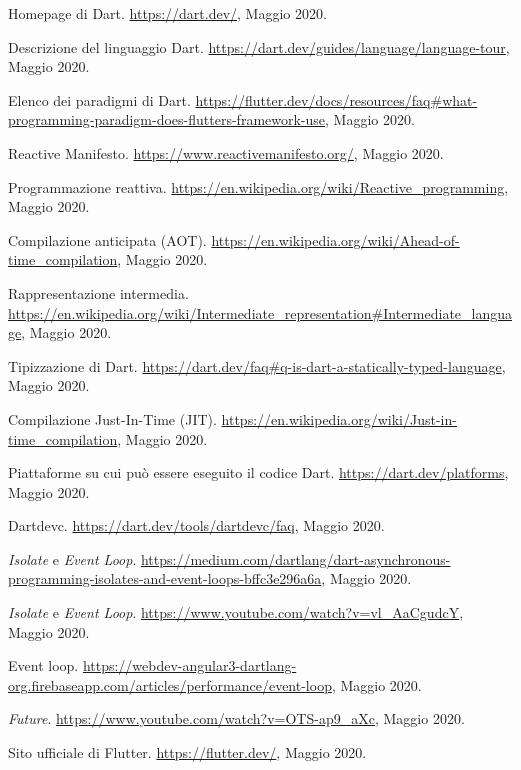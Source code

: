 \begin{thebibliography}{3}
Homepage di Dart. \url{https://dart.dev/}, Maggio 2020.

Descrizione del linguaggio Dart. \url{https://dart.dev/guides/language/language-tour}, Maggio 2020.

Elenco dei paradigmi di Dart. \url{https://flutter.dev/docs/resources/faq#what-programming-paradigm-does-flutters-framework-use}, Maggio 2020.

Reactive Manifesto. \url{https://www.reactivemanifesto.org/}, Maggio 2020.

Programmazione reattiva. \url{https://en.wikipedia.org/wiki/Reactive_programming}, Maggio 2020.

Compilazione anticipata (AOT). \url{https://en.wikipedia.org/wiki/Ahead-of-time_compilation}, Maggio 2020.

Rappresentazione intermedia. \url{https://en.wikipedia.org/wiki/Intermediate_representation#Intermediate_language}, Maggio 2020.

Tipizzazione di Dart. \url{https://dart.dev/faq#q-is-dart-a-statically-typed-language}, Maggio 2020.

Compilazione Just-In-Time (JIT). 
\url{https://en.wikipedia.org/wiki/Just-in-time_compilation}, Maggio 2020.

Piattaforme su cui può essere eseguito il codice Dart. \url{https://dart.dev/platforms}, Maggio 2020.

Dartdevc. \url{https://dart.dev/tools/dartdevc/faq}, Maggio 2020.

\textit{Isolate} e \textit{Event Loop}. \url{https://medium.com/dartlang/dart-asynchronous-programming-isolates-and-event-loops-bffc3e296a6a}, Maggio 2020.

\textit{Isolate} e \textit{Event Loop}. \url{https://www.youtube.com/watch?v=vl_AaCgudcY}, Maggio 2020.

Event loop. \url{https://webdev-angular3-dartlang-org.firebaseapp.com/articles/performance/event-loop}, Maggio 2020.

\textit{Future}. \url{https://www.youtube.com/watch?v=OTS-ap9_aXc}, Maggio 2020.

Sito ufficiale di Flutter. \url{https://flutter.dev/}, Maggio 2020.


\end{thebibliography}
